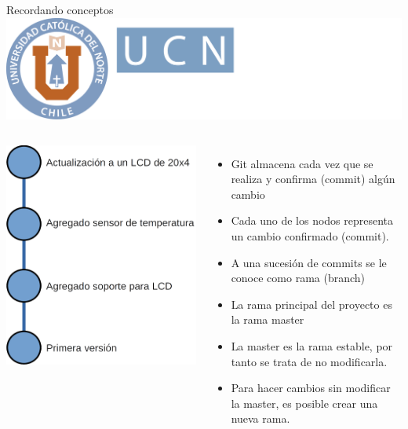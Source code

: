 \documentclass[12pt,a4paper,usenames,x11names,compress]{beamer}
\begin{document}
\begin{frame}{Recordando conceptos \hfill \includegraphics[scale=.1]{eciem.png}}
\begin{columns}
\includegraphics[scale=.23]{commit.png} 
\begin{itemize}
\justifying
 \item Git almacena cada vez que se realiza y confirma (commit) algún cambio
 \item Cada uno de los nodos representa un cambio confirmado (commit).
 \item A una sucesión de commits se le conoce como rama (branch)
 \item La rama principal del proyecto es la rama master
 \item La master es la rama estable, por tanto se trata de no modificarla.
 \item Para hacer cambios sin modificar la master, es posible crear una nueva rama.
\end{itemize}
\end{columns}
\end{frame}
\end{document}
